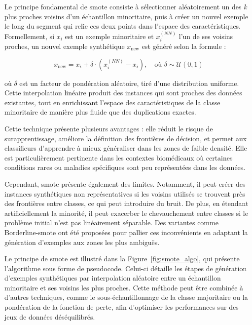 \documentclass[12pt]{report}
\begin{document}
Le principe fondamental de \gls{smote} consiste à sélectionner aléatoirement un des $k$ plus proches voisins d’un échantillon minoritaire, puis à créer un nouvel exemple le long du segment qui relie ces deux points dans l’espace des caractéristiques. Formellement, si $x_i$ est un exemple minoritaire et $x_i^{(NN)}$ l’un de ses voisins proches, un nouvel exemple synthétique $x_{\text{new}}$ est généré selon la formule :

\begin{equation}
x_{\text{new}} = x_i + \delta \cdot (x_i^{(NN)} - x_i), \quad \text{où } \delta \sim \mathcal{U}(0,1)
\end{equation}

où $\delta$ est un facteur de pondération aléatoire, tiré d’une distribution uniforme. Cette interpolation linéaire produit des instances qui sont proches des données existantes, tout en enrichissant l’espace des caractéristiques de la classe minoritaire de manière plus fluide que des duplications exactes.

Cette technique présente plusieurs avantages : elle réduit le risque de surapprentissage, améliore la définition des frontières de décision, et permet aux classifieurs d'apprendre à mieux généraliser dans les zones de faible densité. Elle est particulièrement pertinente dans les contextes biomédicaux où certaines conditions rares ou maladies spécifiques sont peu représentées dans les données.

Cependant, \gls{smote} présente également des limites. Notamment, il peut créer des instances synthétiques non représentatives si les voisins utilisés se trouvent près des frontières entre classes, ce qui peut introduire du bruit. De plus, en étendant artificiellement la minorité, il peut exacerber le chevauchement entre classes si le problème initial n'est pas linéairement séparable. Des variantes comme Borderline-\gls{smote} ont été proposées pour pallier ces inconvénients en adaptant la génération d’exemples aux zones les plus ambiguës.

Le principe de \gls{smote} est illustré dans la Figure~\ref{fig:smote_algo}, qui présente l'algorithme sous forme de pseudocode. Celui-ci détaille les étapes de génération d'exemples synthétiques par interpolation aléatoire entre un échantillon minoritaire et ses voisins les plus proches. Cette méthode peut être combinée à d’autres techniques, comme le sous-échantillonnage de la classe majoritaire ou la pondération de la fonction de perte, afin d’optimiser les performances sur des jeux de données déséquilibrés.
\end{document}
